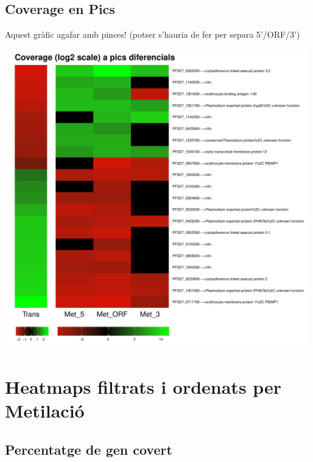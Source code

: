 \documentclass{article}\usepackage[]{graphicx}\usepackage[]{color}
\newenvironment{knitrout}{}{} %
\begin{document}
\subsection{Coverage en Pics}
Aquest gràfic agafar amb pinces! (potser s'hauria de fer per separa 5'/ORF/3')
\begin{knitrout}
\color{fgcolor}

{\centering \includegraphics[width=20cm,height=13cm]{figure/minimal-trans_covapics-1} 

}



\end{knitrout}
\clearpage


\section{Heatmaps filtrats i ordenats per Metilació}
\subsection{Percentatge de gen covert}
\end{document}
